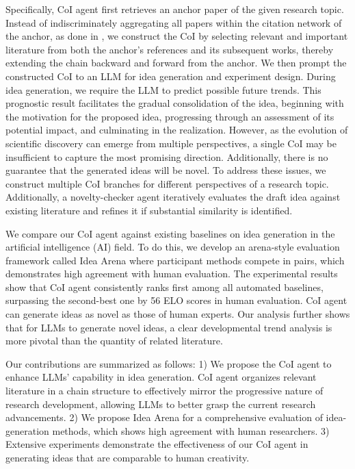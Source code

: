 \documentclass{article}
\newcommand{\orange}[1]{\textcolor{orange}{#1}}
\begin{document}
Specifically, CoI agent first retrieves an anchor paper of the given research topic. Instead of indiscriminately aggregating all papers within the citation network of the anchor, as done in \citep{baek2024researchagent}, we construct the CoI by selecting relevant and important literature from both the anchor's references and its subsequent works, thereby extending the chain backward and forward from the anchor.
We then prompt the constructed CoI to an LLM for idea generation and experiment design.
During idea generation, we require the LLM to predict possible future trends.
This prognostic result facilitates the gradual consolidation of the idea, beginning with the motivation for the proposed idea, progressing through an assessment of its potential impact, and culminating in the realization.
However, as the evolution of scientific discovery can emerge from multiple perspectives, a single CoI may be insufficient to capture the most promising direction. Additionally, there is no guarantee that the generated ideas will be novel. 
To address these issues, we construct multiple CoI branches for different perspectives of a research topic.
Additionally, a novelty-checker agent iteratively evaluates the draft idea against existing literature and refines it if substantial similarity is identified.


We compare our CoI agent against existing baselines on idea generation in the artificial intelligence (AI) field. To do this, we develop an arena-style evaluation framework called Idea Arena where participant methods compete in pairs, which demonstrates high agreement with human evaluation. The experimental results show that CoI agent consistently ranks first among all automated baselines, surpassing the second-best one by 56 ELO scores in human evaluation. CoI agent can generate ideas as novel as those of human experts. 
Our analysis further shows that for LLMs to generate novel ideas, a clear developmental trend analysis is more pivotal than the quantity of related literature.

Our contributions are summarized as follows: 
1) We propose the CoI agent to enhance LLMs' capability in idea generation. CoI agent  organizes relevant literature in a chain structure to effectively mirror the progressive nature of research development, allowing LLMs to better grasp the current  research advancements. 2) We propose Idea Arena for a comprehensive evaluation of idea-generation methods, which shows high agreement with human researchers. 3) Extensive experiments demonstrate the effectiveness of our CoI agent in generating ideas that are comparable to human creativity.


% 

















\end{document}
